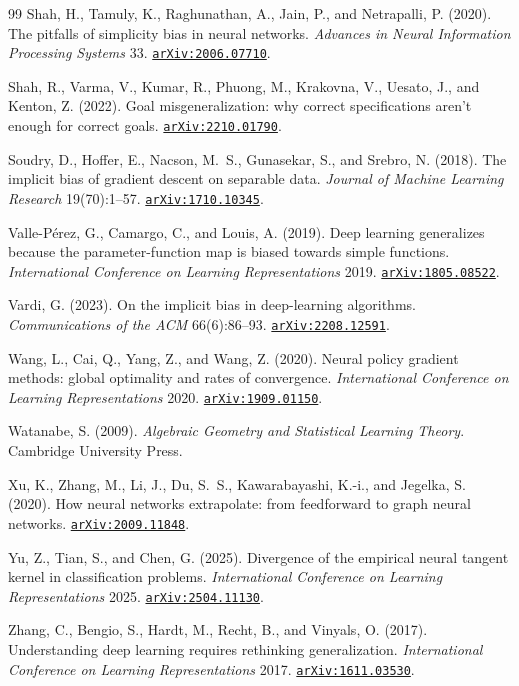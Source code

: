 \documentclass[11pt]{amsart}
\newcommand{\arxiv}[1]{\href{https://arxiv.org/abs/#1}{\texttt{arXiv:#1}}}
\theoremstyle{plain}
\theoremstyle{definition}
\begin{document}
\begin{thebibliography}{99}
 Shah, H., Tamuly, K., Raghunathan, A., Jain, P., and Netrapalli, P. (2020). The pitfalls of simplicity bias in neural networks. \emph{Advances in Neural Information Processing Systems} 33. \arxiv{2006.07710}.

 Shah, R., Varma, V., Kumar, R., Phuong, M., Krakovna, V., Uesato, J., and Kenton, Z. (2022). Goal misgeneralization: why correct specifications aren't enough for correct goals. \arxiv{2210.01790}.

 Soudry, D., Hoffer, E., Nacson, M.~S., Gunasekar, S., and Srebro, N. (2018). The implicit bias of gradient descent on separable data. \emph{Journal of Machine Learning Research} 19(70):1--57. \arxiv{1710.10345}.

 Valle-P\'erez, G., Camargo, C., and Louis, A. (2019). Deep learning generalizes because the parameter-function map is biased towards simple functions. \emph{International Conference on Learning Representations} 2019. \arxiv{1805.08522}.

 Vardi, G. (2023). On the implicit bias in deep-learning algorithms. \emph{Communications of the ACM} 66(6):86--93. \arxiv{2208.12591}.

 Wang, L., Cai, Q., Yang, Z., and Wang, Z. (2020). Neural policy gradient methods: global optimality and rates of convergence. \emph{International Conference on Learning Representations} 2020. \arxiv{1909.01150}.

 Watanabe, S. (2009). \emph{Algebraic Geometry and Statistical Learning Theory}. Cambridge University Press.

 Xu, K., Zhang, M., Li, J., Du, S.~S., Kawarabayashi, K.-i., and Jegelka, S. (2020). How neural networks extrapolate: from feedforward to graph neural networks. \arxiv{2009.11848}.

 Yu, Z., Tian, S., and Chen, G. (2025). Divergence of the empirical neural tangent kernel in classification problems. \emph{International Conference on Learning Representations} 2025. \arxiv{2504.11130}.

 Zhang, C., Bengio, S., Hardt, M., Recht, B., and Vinyals, O. (2017). Understanding deep learning requires rethinking generalization. \emph{International Conference on Learning Representations} 2017. \arxiv{1611.03530}.

\end{thebibliography}
\end{document}
